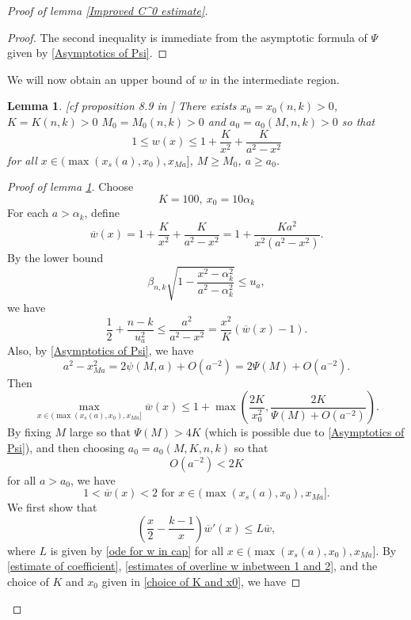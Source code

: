 \documentclass[pdflatex,sn-mathphys-num]{sn-jnl}
\newtheorem{lemma}[theorem]{Lemma}
\begin{document}
\begin{proof}[Proof of lemma \ref{Improved C^0 estimate}]
\begin{proof}
  The second inequality is immediate from the asymptotic formula of $\Psi$ given by \eqref{Asymptotics of Psi}.
\end{proof}
We will now obtain an upper bound of $w$ in the intermediate region.
\begin{lemma}\label{derivative estimate for caps}[cf proposition 8.9 in \cite{ADS}]
    There exists $x_0 = x_0(n,k) > 0$, $K = K(n,k) > 0$ $M_0 = M_0(n,k) > 0$ and $a_0 = a_0(M, n, k) > 0$ so that 
    $$1 \leq w(x) \leq 1 + \frac{K}{x^2} + \frac{K}{a^2 - x^2}$$
    for all $x \in (\max(x_{s}(a), x_0), x_{Ma}]$, $M \geq M_0$, $a \geq a_0$.
\end{lemma}
\begin{proof}[Proof of lemma \ref{derivative estimate for caps}]
Choose
\begin{equation}\label{choice of K and x0}
    K = 100,  \ x_0 = 10 \alpha_k
\end{equation}
For each $a > \alpha_k$, define 
\begin{equation}
    \overline{w}(x) = 1 + \frac{K}{x^2} + \frac{K}{a^2 - x^2} = 1 + \frac{Ka^2}{x^2(a^2 - x^2)}.
\end{equation}
    By the lower bound 
    $$\beta_{n,k}\sqrt{1 - \frac{x^2 - \alpha_k^2}{a^2 - \alpha_k^2}} \leq u_a,$$
     we have
    \begin{equation}\label{estimate of coefficient}
        \frac{1}{2} + \frac{n-k}{u_a^2} \leq \frac{a^2}{a^2 - x^2} = \frac{x^2}{K}(\overline{w}(x)-1).
    \end{equation}
    Also, by \eqref{Asymptotics of Psi}, we have
    $$a^2 - x_{Ma}^2 = 2\psi(M, a) + O(a^{-2}) = 2\Psi(M) + O(a^{-2}).$$
    Then
    $$\max_{x \in (\max(x_{s}(a), x_0), x_{Ma}]}\overline{w}(x) \leq 1 + \max(\frac{2K}{x_0^2}, \frac{2K}{\Psi(M) + O(a^{-2})}).$$
    By fixing $M$ large so that $\Psi(M) > 4K$ (which is possible due to \eqref{Asymptotics of Psi}), and then choosing $a_0 = a_0(M, K, n, k)$ so that $$O(a^{-2}) < 2K$$
    for all $a > a_0$, we have 
    \begin{equation}\label{estimates of overline w inbetween 1 and 2}
        1 < \overline{w}(x) <2 \text{ for }x \in (\max(x_{s}(a), x_0), x_{Ma}].
    \end{equation}
    We first show that
\begin{equation}\label{inequality for overline w in cap}
    (\frac{x}{2} - \frac{k-1}{x})\overline{w}'(x) \leq L\overline{w},
\end{equation}
where $L$ is given by \eqref{ode for w in cap}
for all $x \in (\max(x_{s}(a), x_0), x_{Ma}]$. By \eqref{estimate of coefficient}, \eqref{estimates of overline w inbetween 1 and 2}, and the choice of $K$ and $x_0$ given in \eqref{choice of K and x0}, we have

\end{proof}
\end{proof}
\end{document}
